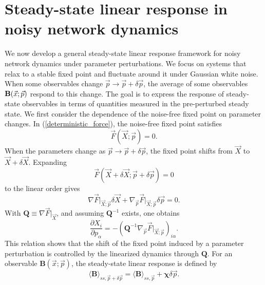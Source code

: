 \section{Steady-state linear response in noisy network dynamics}
We now develop a general steady-state linear response framework for noisy network dynamics under parameter perturbations. We focus on systems that relax to a stable fixed point and fluctuate around it under Gaussian white noise. When some observables change $\vec{p} \rightarrow \vec{p} + \delta \vec{p}$, the average of some observables ${\bf B}(\vec{x}; \vec{p})$ respond to this change. The goal is to express the response of steady-state observables in terms of quantities measured in the pre-perturbed steady state. We first consider the dependence of the noise-free fixed point on parameter changes. In (\ref{deterministic_force}), the noise-free fixed point satisfies
\begin{equation}
    \vec{F}(\vec{X}; \vec{p}) = 0.
\end{equation}
When the parameters change as $\vec{p} \rightarrow \vec{p} + \delta \vec{p}$, the fixed point shifts from $\vec{X}$ to $\vec{X}+\delta \vec{X}$. Expanding
\begin{equation}
    \vec{F}(\vec{X}+\delta \vec{X}; \vec{p}+ \delta \vec{p}) = 0
\end{equation}
to the linear order gives
\begin{equation}
    \nabla \vec{F}\big|_{\vec{X}; \vec{p}} \delta \vec{X} + \nabla_{\vec{p}}\vec{F}\big|_{\vec{X}; \vec{p}} \delta \vec {p} = 0.
\end{equation}
With $\mathbf{Q}\equiv\nabla\vec{F}\big|_{\vec{X}}$, and assuming $\mathbf{Q}^{-1}$ exists, one obtains
\begin{equation}
    \frac{\partial X_i}{\partial p_\alpha} = -\left(\mathbf{Q}^{-1} \nabla_{\vec{p}} \vec{F}\big|_{\vec{X}; \vec{p}}\right)_{i\alpha}.
\end{equation}
This relation shows that the shift of the fixed point induced by a parameter perturbation is controlled by the linearized dynamics through $\mathbf{Q}$. For an observable $\mathbf{B}(\vec{x}; \vec{p})$, the steady-state linear response is defined by
\begin{equation}
    \langle \mathbf{B} \rangle_{ss, \vec{p}+\delta \vec{p}} = \langle \mathbf{B} \rangle_{ss, \vec{p}} + \boldsymbol{\chi} \delta \vec{p}.
    \label{response}
\end{equation}

